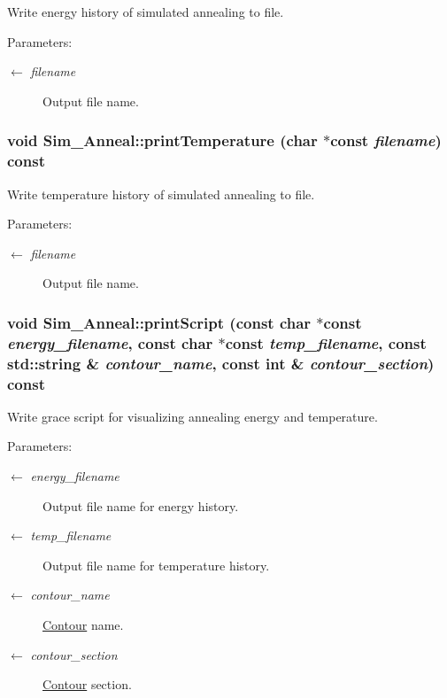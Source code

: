 Write energy history of simulated annealing to file. \begin{Desc}
\item[Parameters:]
\begin{description}
\item[\mbox{$\leftarrow$} {\em filename}]Output file name. \end{description}
\end{Desc}
\hypertarget{classSim__Anneal_d89aa35317c42d1e286f735d373329e5}{
\subsubsection[printTemperature]{\setlength{\rightskip}{0pt plus 5cm}void Sim\_\-Anneal::printTemperature (char $\ast$const  {\em filename}) const}}
\label{classSim__Anneal_d89aa35317c42d1e286f735d373329e5}


Write temperature history of simulated annealing to file. \begin{Desc}
\item[Parameters:]
\begin{description}
\item[\mbox{$\leftarrow$} {\em filename}]Output file name. \end{description}
\end{Desc}
\hypertarget{classSim__Anneal_465eb7c7301f09265dafa68d60266bb5}{
\subsubsection[printScript]{\setlength{\rightskip}{0pt plus 5cm}void Sim\_\-Anneal::printScript (const char $\ast$const  {\em energy\_\-filename}, \/  const char $\ast$const  {\em temp\_\-filename}, \/  const std::string \& {\em contour\_\-name}, \/  const int \& {\em contour\_\-section}) const}}
\label{classSim__Anneal_465eb7c7301f09265dafa68d60266bb5}


Write grace script for visualizing annealing energy and temperature. \begin{Desc}
\item[Parameters:]
\begin{description}
\item[\mbox{$\leftarrow$} {\em energy\_\-filename}]Output file name for energy history. \item[\mbox{$\leftarrow$} {\em temp\_\-filename}]Output file name for temperature history. \item[\mbox{$\leftarrow$} {\em contour\_\-name}]\hyperlink{classContour}{Contour} name. \item[\mbox{$\leftarrow$} {\em contour\_\-section}]\hyperlink{classContour}{Contour} section. \end{description}
\end{Desc}


